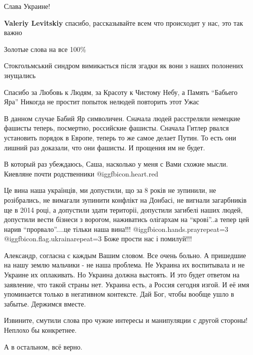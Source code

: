 \begin{itemize}
Слава Украине!

\textbf{Valeriy Levitskiy} спасибо, рассказывайте всем что происходит у нас, это так важно

Золотые слова на все 100\%

Стокгольмський синдром вимикається після згадки як вони з наших полонених знущались


Спасибо за Любовь к Людям, за Красоту к Чистому Небу, а Память \enquote{Бабьего
Яра} Никогда не простит попыток нелюдей повторить этот Ужас


В данном случае Бабий Яр символичен. Сначала людей расстреляли немецкие фашисты
теперь, посмертно, российские фашисты. Сначала Гитлер рвался установить порядок
в Европе, теперь то же самое делает Путин. То есть они лишний раз доказали, что
они фашисты. И прощения им не будет.


В который раз убеждаюсь, Саша, насколько у меня с Вами схожие мысли. Киевляне
почти родственники @igg{fbicon.heart.red}


Це вина наша українців, ми допустили, що за 8 років не зупинили, не
розібрались, не вимагали зупинити конфлікт на Донбасі, не вигнали загарбників ще
в 2014 році, а допустили здати територіі, допустили загибелі наших людей,
допустили вести бізнеси з ворогом, наживатись олігархам на \enquote{крові}..а
тепер цей нарив \enquote{прорвало}....це тільки наша вина!!!
@igg{fbicon.hands.pray}{repeat=3} @igg{fbicon.flag.ukraina}{repeat=3} Боже
прости нас і помилуй!!!


Александр, согласна с каждым Вашим словом. Все очень больно. А пришедшие на
нашу землю мальчики - не наша проблема. Не Украина их воспитывала и не Украине
их оплакивать. Но Украина должна выстоять. И это будет ответом на заявление,
что такой страны нет. Украина есть, а Россия сегодня изгой. И её имя
упоминается только в негативном контексте. Дай Бог, чтобы вообще ушло в
забытье. Держимся вместе.



Извините, смутили слова про чужие интересы и манипуляции с другой стороны! Неплохо бы конкретнее.

А в остальном, всё верно.

\end{itemize} %
